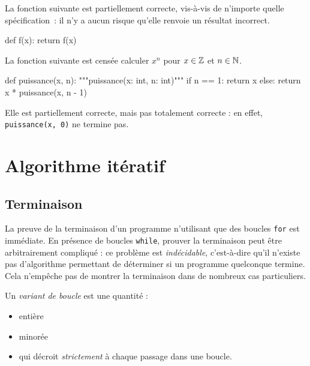 \documentclass{magnolia}
\begin{document}
\begin{exemples}

    \exemple La fonction suivante est partiellement correcte, vis-à-vis de
          n'importe quelle spécification~: il n'y a aucun risque qu'elle renvoie
          un résultat incorrect.
\begin{pythoncodeline}
def f(x):
    return f(x)
\end{pythoncodeline}
    \exemple La fonction suivante est censée calculer $x^{n}$ pour $x \in \mathbb{Z}$
          et $n \in \mathbb{N}$.
\begin{pythoncodeline}
def puissance(x, n):
    """puissance(x: int, n: int)"""
    if n == 1:
        return x
    else:
        return x * puissance(x, n - 1)
\end{pythoncodeline}
          Elle est partiellement correcte, mais pas totalement correcte :
          en effet, \verb!puissance(x, 0)! ne termine pas.

\end{exemples}

\section{Algorithme itératif}

\subsection{Terminaison}

La preuve de la terminaison d'un programme n'utilisant que des boucles \verb!for! est
immédiate. En présence de
boucles \verb!while!, prouver la terminaison peut être arbitrairement
compliqué :  ce
problème est \emph{indécidable}, c'est-à-dire qu'il n'existe pas
d'algorithme permettant de déterminer si un programme quelconque
termine. Cela n'empêche pas de montrer la terminaison
dans de nombreux cas particuliers.



\begin{definition}[nom={Variant de boucle}]
  Un \emph{variant de boucle} est une quantité :
  \begin{itemize}
    \item entière
    \item minorée
    \item qui décroit \emph{strictement} à chaque passage dans une
          boucle.
  \end{itemize}
\end{definition}
\end{document}
